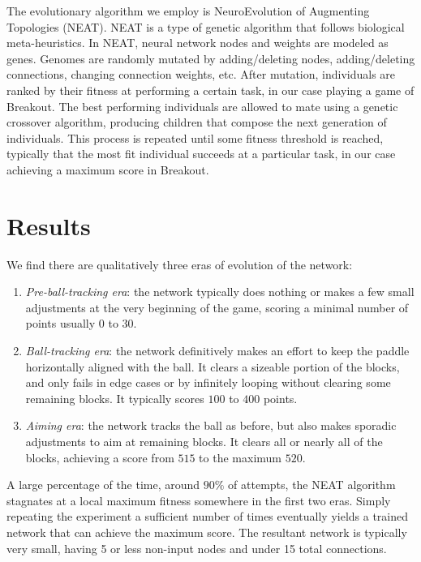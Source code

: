 \documentclass[letterpaper, twocolumn, conference]{article}
\begin{document}
The evolutionary algorithm we employ is NeuroEvolution of Augmenting Topologies (NEAT).
NEAT is a type of genetic algorithm that follows biological meta-heuristics.
In NEAT, neural network nodes and weights are modeled as genes.
Genomes are randomly mutated by adding/deleting nodes, adding/deleting connections, changing connection weights, etc.
After mutation, individuals are ranked by their fitness at performing a certain task, in our case playing a game of Breakout.
The best performing individuals are allowed to mate using a genetic crossover algorithm,
producing children that compose the next generation of individuals.
This process is repeated until some fitness threshold is reached, typically that the most fit individual succeeds at a particular task, in our case achieving a maximum score in Breakout.

\section{Results}
We find there are qualitatively three eras of evolution of the network:
\begin{enumerate}
    \item{}\emph{Pre-ball-tracking era}: the network typically does nothing or makes a few small adjustments at the very beginning of the game, scoring a minimal number of points usually $0$ to $30$.
    \item{}\emph{Ball-tracking era}: the network definitively makes an effort to keep the paddle horizontally aligned with the ball. It clears a sizeable portion of the blocks, and only fails in edge cases or by infinitely looping without clearing some remaining blocks. It typically scores $100$ to $400$ points.
    \item{}\emph{Aiming era}: the network tracks the ball as before, but also makes sporadic adjustments to aim at remaining blocks. It clears all or nearly all of the blocks, achieving a score from $515$ to the maximum $520$.
\end{enumerate}
A large percentage of the time, around $90\%$ of attempts, the NEAT algorithm stagnates at a local maximum
fitness somewhere in the first two eras.
Simply repeating the experiment a sufficient number of times eventually yields a trained network that
can achieve the maximum score.
The resultant network is typically very small, having 5 or less non-input nodes and under 15 total connections.
\end{document}
